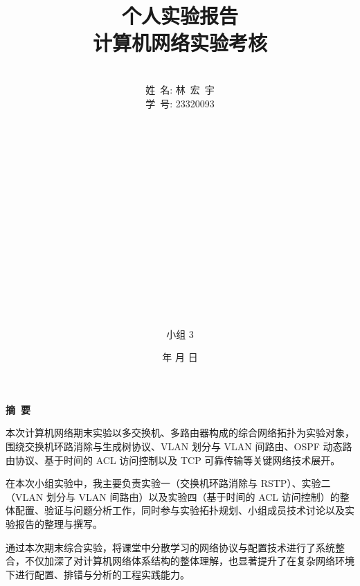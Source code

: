 \documentclass[a4paper]{article}
\begin{document}
\renewcommand{\contentsname}{目\ 录}
\renewcommand{\appendixname}{附录}
\renewcommand{\appendixpagename}{附录}
\renewcommand{\refname}{参考文献} 
\renewcommand{\figurename}{图}
\renewcommand{\tablename}{表}
\renewcommand{\today}{\number\year 年 \number\month 月 \number\day 日}

\title{{\Huge 个人实验报告{\large\linebreak\\}}{\Large 计算机网络实验考核\linebreak\linebreak}}
\author{\\姓\ 名: 林\ 宏\ 宇\\
学\ 号: 23320093\\
\\\\\\\\\\\\\\\\\\\\\\\\\\\\\\\\
小组 3 \\}
\date{\today}
\maketitle
\newpage

\begin{center}
{\Large\bf{摘\ 要\\}}
\end{center}

本次计算机网络期末实验以多交换机、多路由器构成的综合网络拓扑为实验对象，围绕交换机环路消除与生成树协议、VLAN 划分与 VLAN 间路由、OSPF 动态路由协议、基于时间的 ACL 访问控制以及 TCP 可靠传输等关键网络技术展开。  

在本次小组实验中，我主要负责实验一（交换机环路消除与 RSTP）、实验二（VLAN 划分与 VLAN 间路由）以及实验四（基于时间的 ACL 访问控制）的整体配置、验证与问题分析工作，同时参与实验拓扑规划、小组成员技术讨论以及实验报告的整理与撰写。  

通过本次期末综合实验，将课堂中分散学习的网络协议与配置技术进行了系统整合，不仅加深了对计算机网络体系结构的整体理解，也显著提升了在复杂网络环境下进行配置、排错与分析的工程实践能力。
\end{document}
